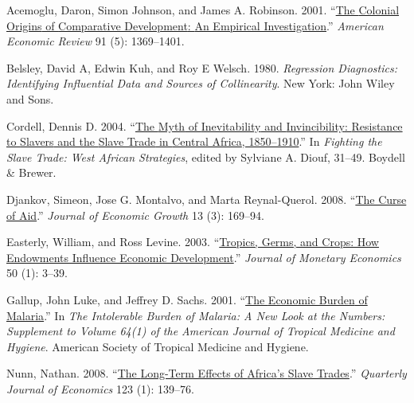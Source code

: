 \documentclass[
  letterpaper,
  DIV=11,
  numbers=noendperiod]{scrartcl}
\newlength{\cslhangindent}
\newenvironment{CSLReferences}[2] %
 {\begin{list}{}{%
  \setlength{\itemindent}{0pt}
  \setlength{\leftmargin}{0pt}
  \setlength{\parsep}{0pt}
  \ifodd #1
   \setlength{\leftmargin}{\cslhangindent}
   \setlength{\itemindent}{-1\cslhangindent}
  \fi
  \setlength{\itemsep}{#2\baselineskip}}}
 {\end{list}}
\begin{document}
\label{refs}
\begin{CSLReferences}{1}{0}
Acemoglu, Daron, Simon Johnson, and James A. Robinson. 2001.
{``\href{https://doi.org/10.1257/aer.91.5.1369}{The {Colonial Origins}
of {Comparative Development}: {An Empirical Investigation}}.''}
\emph{American Economic Review} 91 (5): 1369--1401.

Belsley, David A, Edwin Kuh, and Roy E Welsch. 1980. \emph{Regression
Diagnostics: {Identifying} Influential Data and Sources of
Collinearity}. New York: {John Wiley and Sons}.

Cordell, Dennis D. 2004.
{``\href{https://www.cambridge.org/core/books/fighting-the-slave-trade/myth-of-inevitability-and-invincibility-resistance-to-slavers-and-the-slave-trade-in-central-africa-18501910/E2E9819E2BBD9A958F4BB7CDC505764C}{The
{Myth} of {Inevitability} and {Invincibility}: {Resistance} to {Slavers}
and the {Slave Trade} in {Central Africa}, 1850--1910}.''} In
\emph{Fighting the {Slave Trade}: {West African Strategies}}, edited by
Sylviane A. Diouf, 31--49. Boydell \& Brewer.

Djankov, Simeon, Jose G. Montalvo, and Marta Reynal-Querol. 2008.
{``\href{https://doi.org/10.1007/s10887-008-9032-8}{The Curse of
Aid}.''} \emph{Journal of Economic Growth} 13 (3): 169--94.

Easterly, William, and Ross Levine. 2003.
{``\href{https://doi.org/10.1016/S0304-3932(02)00200-3}{Tropics, Germs,
and Crops: How Endowments Influence Economic Development}.''}
\emph{Journal of Monetary Economics} 50 (1): 3--39.

Gallup, John Luke, and Jeffrey D. Sachs. 2001.
{``\href{https://www.ncbi.nlm.nih.gov/books/NBK2624/}{The {Economic
Burden} of {Malaria}}.''} In \emph{The {Intolerable Burden} of
{Malaria}: {A New Look} at the {Numbers}: {Supplement} to {Volume} 64(1)
of the {American Journal} of {Tropical Medicine} and {Hygiene}}.
{American Society of Tropical Medicine and Hygiene}.

Nunn, Nathan. 2008.
{``\href{https://doi.org/10.1162/qjec.2008.123.1.139}{The {Long-Term
Effects} of {Africa}'s {Slave Trades}}.''} \emph{Quarterly Journal of
Economics} 123 (1): 139--76.


\end{CSLReferences}
\end{document}
